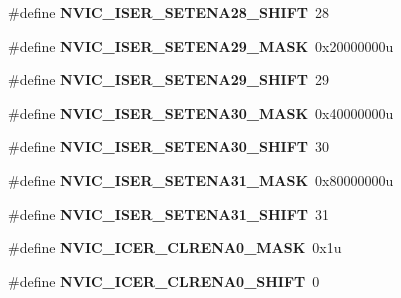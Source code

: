 \begin{DoxyCompactItemize}
\#define {\bfseries N\+V\+I\+C\+\_\+\+I\+S\+E\+R\+\_\+\+S\+E\+T\+E\+N\+A28\+\_\+\+S\+H\+I\+FT}~28
\item 
\mbox{\label{group___n_v_i_c___register___masks_ga51df809d7d7176779aba04eda0c53cfa}} 
\#define {\bfseries N\+V\+I\+C\+\_\+\+I\+S\+E\+R\+\_\+\+S\+E\+T\+E\+N\+A29\+\_\+\+M\+A\+SK}~0x20000000u
\item 
\mbox{\label{group___n_v_i_c___register___masks_gac07f42744aea8f34a6144f77bb401c4c}} 
\#define {\bfseries N\+V\+I\+C\+\_\+\+I\+S\+E\+R\+\_\+\+S\+E\+T\+E\+N\+A29\+\_\+\+S\+H\+I\+FT}~29
\item 
\mbox{\label{group___n_v_i_c___register___masks_ga7a00f91e688dd92e04740ad3fa3de710}} 
\#define {\bfseries N\+V\+I\+C\+\_\+\+I\+S\+E\+R\+\_\+\+S\+E\+T\+E\+N\+A30\+\_\+\+M\+A\+SK}~0x40000000u
\item 
\mbox{\label{group___n_v_i_c___register___masks_ga83b0c5adc6de369a67b36cc38ae7209d}} 
\#define {\bfseries N\+V\+I\+C\+\_\+\+I\+S\+E\+R\+\_\+\+S\+E\+T\+E\+N\+A30\+\_\+\+S\+H\+I\+FT}~30
\item 
\mbox{\label{group___n_v_i_c___register___masks_gaa2d8198df9296263de4f8db7d8727815}} 
\#define {\bfseries N\+V\+I\+C\+\_\+\+I\+S\+E\+R\+\_\+\+S\+E\+T\+E\+N\+A31\+\_\+\+M\+A\+SK}~0x80000000u
\item 
\mbox{\label{group___n_v_i_c___register___masks_gaf4e9b881377e0dd1f51a1551bfdb7f47}} 
\#define {\bfseries N\+V\+I\+C\+\_\+\+I\+S\+E\+R\+\_\+\+S\+E\+T\+E\+N\+A31\+\_\+\+S\+H\+I\+FT}~31
\item 
\mbox{\label{group___n_v_i_c___register___masks_gaabfb09a9154cc1a657e4537e68c9702a}} 
\#define {\bfseries N\+V\+I\+C\+\_\+\+I\+C\+E\+R\+\_\+\+C\+L\+R\+E\+N\+A0\+\_\+\+M\+A\+SK}~0x1u
\item 
\mbox{\label{group___n_v_i_c___register___masks_gaec9c9550c79d3cbb214be9a5affd43ec}} 
\#define {\bfseries N\+V\+I\+C\+\_\+\+I\+C\+E\+R\+\_\+\+C\+L\+R\+E\+N\+A0\+\_\+\+S\+H\+I\+FT}~0

\end{DoxyCompactItemize}
